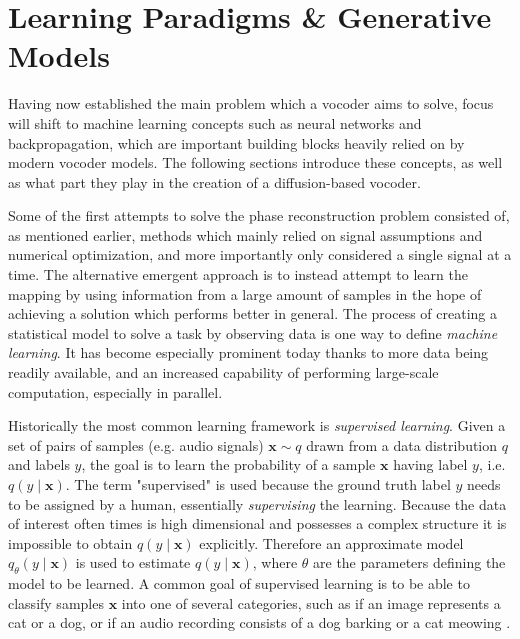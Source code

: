\documentclass{report}
\begin{document}
\section{Learning Paradigms \& Generative Models}

Having now established the main problem which a vocoder aims to solve, focus will shift to machine learning concepts such as neural networks and backpropagation, which are important building blocks heavily relied on by modern vocoder models. The following sections introduce these concepts, as well as what part they play in the creation of a diffusion-based vocoder.

Some of the first attempts to solve the phase reconstruction problem consisted of, as mentioned earlier, methods which mainly relied on signal assumptions and numerical optimization, and more importantly only considered a single signal at a time. The alternative emergent approach is to instead attempt to learn the mapping by using information from a large amount of samples in the hope of achieving a solution which performs better in general. The process of creating a statistical model to solve a task by observing data is one way to define \textit{machine learning}. It has become especially prominent today thanks to more data being readily available, and an increased capability of performing large-scale computation, especially in parallel.

Historically the most common learning framework is \textit{supervised learning}. Given a set of pairs of samples (e.g. audio signals) $\bm{x} \sim q$ drawn from a data distribution $q$ and labels $y$, the goal is to learn the probability of a sample $\bm{x}$ having label $y$, i.e. $q(y\mid \bm{x})$. The term "supervised" is used because the ground truth label $y$ needs to be assigned by a human, essentially \textit{supervising} the learning. Because the data of interest often times is high dimensional and possesses a complex structure it is impossible to obtain $q(y \mid \bm{x})$ explicitly. Therefore an approximate model $q_{\theta}(y \mid \bm{x})$ is used to estimate $q(y \mid \bm{x})$, where $\theta$ are the parameters defining the model to be learned. A common goal of supervised learning is to be able to classify samples $\bm{x}$ into one of several categories, such as if an image represents a cat or a dog, or if an audio recording consists of a dog barking or a cat meowing \cite{goodfellow2016deep}. 
\end{document}

